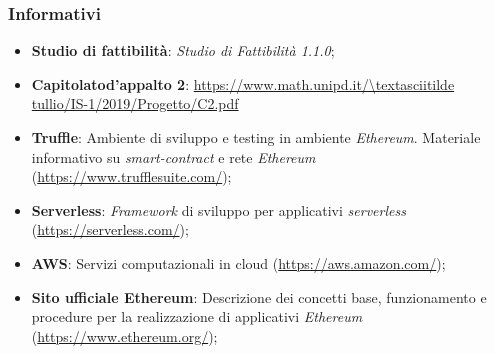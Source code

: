 \subsubsection{Informativi}
\begin{itemize}
	\item \textbf{Studio di fattibilità}: \textit{Studio di Fattibilità 1.1.0\docs};
    \item \textbf{Capitolato\glo d'appalto 2}: \url{https://www.math.unipd.it/\textasciitilde tullio/IS-1/2019/Progetto/C2.pdf}
	\item \textbf{Truffle}:  Ambiente di sviluppo e testing in ambiente \textit{Ethereum\glos}. Materiale informativo su \textit{smart-contract\glo} e rete \textit{Ethereum\glos} (\url{https://www.trufflesuite.com/});
	\item \textbf{Serverless\glos}:  \textit{Framework\glo} di sviluppo per applicativi \textit{serverless\glos} (\url{https://serverless.com/});
	\item \textbf{AWS}: Servizi computazionali in cloud (\url{https://aws.amazon.com/});
	\item \textbf{Sito ufficiale Ethereum\glos}: Descrizione dei concetti base, funzionamento e procedure per la realizzazione di applicativi \textit{Ethereum\glos} (\url {https://www.ethereum.org/});
\end{itemize}

	
	
	